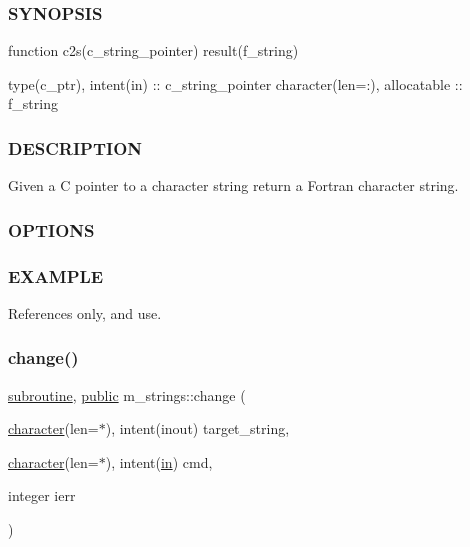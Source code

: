 \subsubsection*{S\+Y\+N\+O\+P\+S\+IS}

\begin{DoxyVerb}function c2s(c_string_pointer) result(f_string)

 type(c_ptr), intent(in)       :: c_string_pointer
 character(len=:), allocatable  :: f_string
\end{DoxyVerb}
 \subsubsection*{D\+E\+S\+C\+R\+I\+P\+T\+I\+ON}

Given a C pointer to a character string return a Fortran character string. \subsubsection*{O\+P\+T\+I\+O\+NS}

\subsubsection*{E\+X\+A\+M\+P\+LE}

References only, and use.

\mbox{\label{namespacem__strings_a1222f3b718f7637105bde330367925e1}} 
\subsubsection{\texorpdfstring{change()}{change()}}
{\footnotesize\ttfamily \hyperlink{M__stopwatch_83_8txt_acfbcff50169d691ff02d4a123ed70482}{subroutine}, \hyperlink{M__stopwatch_83_8txt_a2f74811300c361e53b430611a7d1769f}{public} m\+\_\+strings\+::change (\begin{DoxyParamCaption}\item[{\hyperlink{option__stopwatch_83_8txt_abd4b21fbbd175834027b5224bfe97e66}{character}(len=$\ast$), intent(inout)}]{target\+\_\+string,  }\item[{\hyperlink{option__stopwatch_83_8txt_abd4b21fbbd175834027b5224bfe97e66}{character}(len=$\ast$), intent(\hyperlink{M__journal_83_8txt_afce72651d1eed785a2132bee863b2f38}{in})}]{cmd,  }\item[{integer}]{ierr }\end{DoxyParamCaption})}



